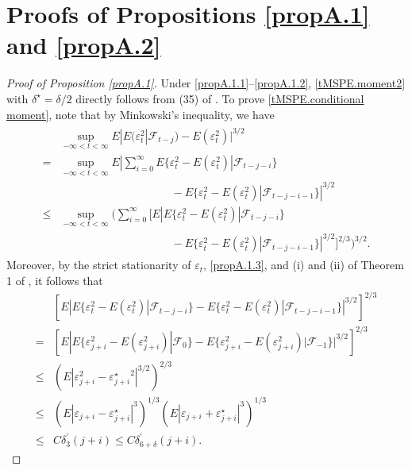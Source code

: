 \documentclass[ejsv2]{imsart}
\theoremstyle{plain}
\theoremstyle{definition}
\theoremstyle{remark}
\begin{document}
\section{Proofs of Propositions \ref{propA.1} and \ref{propA.2}}\label{supp3.1}
{
\begin{proof}[Proof of Proposition \ref{propA.1}]
Under \eqref{propA.1.1}--\eqref{propA.1.2}, \eqref{tMSPE.moment2} with $\delta^\star=\delta/2$ directly follows from (35) of \cite{Xiao2011}. To prove \eqref{tMSPE.conditional moment}, note that by Minkowski's inequality, we have
\begin{align}\label{pp3.2.1}
\begin{split}
     & \sup\limits_{-\infty<t<\infty} E|E(\varepsilon_t^2|\mathcal{F}_{t-j})-E(\varepsilon_t^2)|^{3/2} \\
   =  & \sup\limits_{-\infty<t<\infty} E|\sum_{i=0}^{\infty} E\{\varepsilon_t^2-E(\varepsilon_t^2)|\mathcal{F}_{t-j-i}\}\\
   &\hspace{10em}-E\{\varepsilon_t^2-E(\varepsilon_t^2)|\mathcal{F}_{t-j-i-1}\}|^{3/2}\\
   \leq & \sup\limits_{-\infty<t<\infty} (\sum_{i=0}^{\infty}[E| E\{\varepsilon_t^2-E(\varepsilon_t^2)|\mathcal{F}_{t-j-i}\}\\
   &\hspace{10em}-E\{\varepsilon_t^2-E(\varepsilon_t^2)|\mathcal{F}_{t-j-i-1}\}|^{3/2}]^{2/3})^{3/2}.
   \end{split}
\end{align}
Moreover, by the strict stationarity of $\varepsilon_t$, \eqref{propA.1.3}, and (i) and (ii) of Theorem 1 of \cite{Wu2005Main}, it follows that
\begin{equation}\label{pp3.2.2}
\begin{split}
     & [E| E\{\varepsilon_t^2-E(\varepsilon_t^2)|\mathcal{F}_{t-j-i}\}-E\{\varepsilon_t^2-E(\varepsilon_t^2)|\mathcal{F}_{t-j-i-1}\}|^{3/2}]^{2/3} \\
    = & [E| E\{\varepsilon_{j+i}^2-E(\varepsilon_{j+i}^2)|\mathcal{F}_{0}\}-E\{\varepsilon_{j+i}^2-E(\varepsilon_{j+i}^2)|\mathcal{F}_{-1}\}|^{3/2}]^{2/3}\\
    \leq & (E|\varepsilon_{j+i}^2-{\varepsilon^\star_{j+i}}^2|^{3/2})^{2/3}\\
    \leq & (E|\varepsilon_{j+i}-\varepsilon^\star_{j+i}|^{3})^{1/3}(E|\varepsilon_{j+i}+\varepsilon^\star_{j+i}|^{3})^{1/3}\\
    \leq & C\delta^\prime_{3}(j+i)\leq C\delta^\prime_{6+\delta}(j+i).
\end{split}

\end{equation}
\end{proof}}
\end{document}
